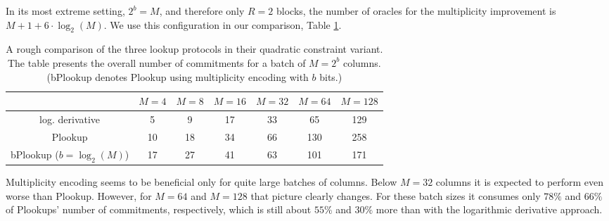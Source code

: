 \documentclass[11pt]{article}
\theoremstyle{definition}
\theoremstyle{definition}
\begin{document}
In its most extreme setting, $2^b = M$, and therefore only $R=2$ blocks, the number of oracles for the multiplicity improvement is 
$M + 1 + 6 \cdot\log_2(M)$.
We use this configuration in our comparison, Table \ref{tab:comparison:bPlookup}. 
 
\begin{table}
\caption{%
A rough comparison of the three lookup protocols in their quadratic constraint variant.
The table presents the overall number of commitments for a batch of $M=2^b$ columns. 
(bPlookup denotes Plookup using multiplicity encoding with $b$ bits.) 
}
\label{tab:comparison:bPlookup}
\centering
\vspace*{0.5cm}
\begin{tabular}{|c|c|c|c|c|c|c|}
\cline{2-7}
\multicolumn{1}{c|}{} &$M = 4$ & $M=8$ & $M=16$ & $M=32$ & $M=64$ & $M=128$
\\\hline
log. derivative & 5 & 9 & 17 & 33 & 65 & 129
\\
Plookup & 10 & 18 & 34 & 66 & 130 & 258
\\
bPlookup ($b=\log_2(M)$) & 17 & 27 & 41 & 63 & 101 & 171
\\\hline
\end{tabular}
\end{table}

Multiplicity encoding seems to be beneficial only for quite large batches of columns. 
Below $M = 32$ columns it is expected to perform even worse than Plookup. 
However, for $M=64$ and $M=128$ that picture clearly changes.  
For these batch sizes it consumes only $78\%$ and $66\%$ of Plookups' number of commitments, respectively, which is still about $55\%$ and  $30\%$ more than with the logarithmic derivative approach.

\end{document}
